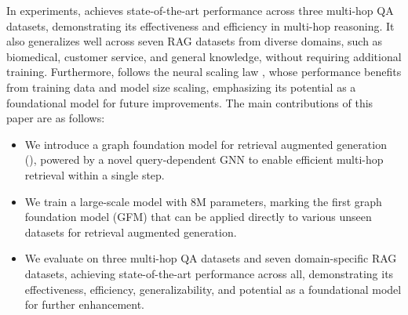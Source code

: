 In experiments, \ourmethod achieves state-of-the-art performance across three multi-hop QA datasets, demonstrating its effectiveness and efficiency in multi-hop reasoning. It also generalizes well across seven RAG datasets from diverse domains, such as biomedical, customer service, and general knowledge, without requiring additional training. Furthermore, \ourmethod follows the neural scaling law \citep{hestness2017deep}, whose performance benefits from training data and model size scaling, emphasizing its potential as a foundational model for future improvements.
%
The main contributions of this paper are as follows:
\begin{itemize}
\item We introduce a graph foundation model for retrieval augmented generation (\ourmethod), powered by a novel query-dependent GNN to enable efficient multi-hop retrieval within a single step.
\item We train a large-scale model with 8M parameters, marking the first graph foundation model (GFM) that can be applied directly to various unseen datasets for retrieval augmented generation.
\item We evaluate \ourmethod on three multi-hop QA datasets and seven domain-specific RAG datasets, achieving state-of-the-art performance across all, demonstrating its effectiveness, efficiency, generalizability, and potential as a foundational model for further enhancement.
\end{itemize}

